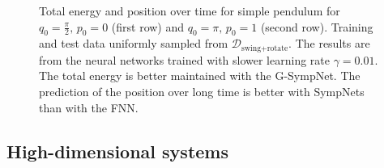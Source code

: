 \documentclass[twoside,a4paper]{article}
\begin{document}
\begin{figure}
	\caption{Total energy and position over time for simple pendulum for $q_0 = \frac{\pi}{2},\, p_0 = 0$
	(first row) and $q_0 = \pi,\, p_0=1$ (second row).
	Training and test data uniformly sampled from $\mathcal{D}_{\text{swing+rotate}}$.
	The results are from the neural networks trained with slower learning rate $\gamma = 0.01$.
	The total energy is better maintained with the G-SympNet.
	The prediction of the position over long time is better with SympNets than with the FNN.}
\end{figure}

\subsection{High-dimensional systems}
\end{document}
